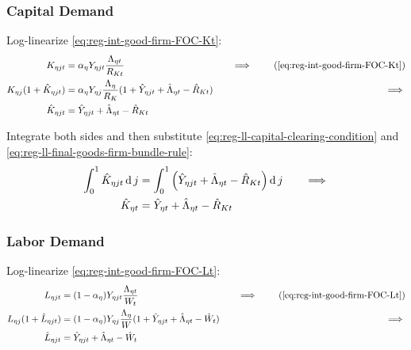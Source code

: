 \documentclass[../thesis.tex]{subfiles}
\begin{document}

\subsubsection*{Capital Demand}

Log-linearize \ref{eq:reg-int-good-firm-FOC-Kt}:
\begin{alignat}{2}
	K_{\eta jt} &= {\alpha_{\eta}} Y_{\eta jt} \frac{\Lambda_{\eta t}}{R_{Kt}} &\implies \tag{\ref{eq:reg-int-good-firm-FOC-Kt}} \\
	K_{\eta j} (1+ \hat{K}_{\eta jt}) &= {\alpha_{\eta}} Y_{\eta j} \frac{\Lambda_{\eta}}{R_{K}} (1+ \hat{Y}_{\eta jt} + \hat{\Lambda}_{\eta t} - \hat{R}_{K t}) \quad &\implies \nonumber \\
	\hat{K}_{\eta jt} &= \hat{Y}_{\eta jt} + \hat{\Lambda}_{\eta t} - \hat{R}_{K t} \nonumber
\end{alignat}

Integrate both sides and then substitute \ref{eq:reg-ll-capital-clearing-condition} and \ref{eq:reg-ll-final-goods-firm-bundle-rule}:
\begin{alignat}{2}
	\int_{0}^{1} \hat{K}_{\eta jt} \operatorname{d} j &= \int_{0}^{1} \left( \hat{Y}_{\eta jt} + \hat{\Lambda}_{\eta t} - \hat{R}_{K t} \right) \operatorname{d} j \quad &\implies \nonumber \\
	\hat{K}_{\eta t} &= \hat{Y}_{\eta t} + \hat{\Lambda}_{\eta t} - \hat{R}_{K t} \label{eq:reg-ll-int-good-firm-FOC-Kt}
\end{alignat}


\subsubsection*{Labor Demand}

Log-linearize \ref{eq:reg-int-good-firm-FOC-Lt}:
\begin{alignat}{2}
	L_{\eta jt} &= (1-{\alpha_{\eta}}) Y_{\eta jt} \frac{\Lambda_{\eta t}}{W_{t}} &\implies \tag{\ref{eq:reg-int-good-firm-FOC-Lt}} \\
	L_{\eta j} (1+ \hat{L}_{\eta jt}) &= (1-{\alpha_{\eta}}) Y_{\eta j} \frac{\Lambda_{\eta}}{W} (1+ \hat{Y}_{\eta jt} +\hat{\Lambda}_{\eta t} -\hat{W}_{t}) \quad &\implies \nonumber \\
	\hat{L}_{\eta jt} &= \hat{Y}_{\eta jt} +\hat{\Lambda}_{\eta t} -\hat{W}_{t} \nonumber
\end{alignat}
\end{document}
